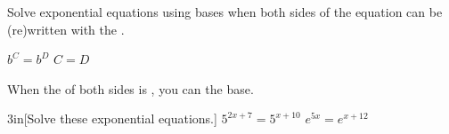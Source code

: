 \begin{minipage}{0.55\textwidth}
    Solve exponential equations using
     bases when both sides of the equation
    can be (re)written with the .
\end{minipage}
\begin{minipage}{0.44\textwidth}
    \begin{myCenteredBox}[width=2.75in,]
        \centering\large
        $b^C = b^D$ \quad {\Large $\Longleftrightarrow$} \quad $C = D$
    \end{myCenteredBox}
\end{minipage}

\begin{myCenteredBox}[width=5in]
    When the  of both sides is ,
    you can  the base.
\end{myCenteredBox}

\begin{my2Problems}[\normalsize]{3in}[Solve these exponential equations.]
    {
        $5^{2x+7} = 5^{x+10}$
    }
    {
        $e^{5x} = e^{x+12}$
    }
\end{my2Problems}
